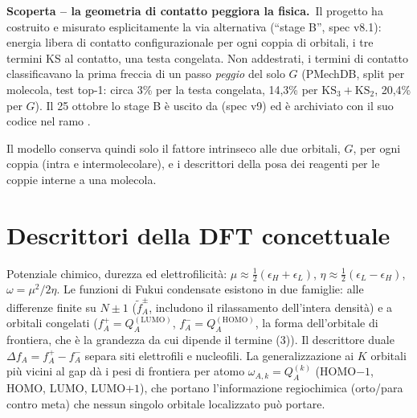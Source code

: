 \documentclass[11pt,a4paper]{report}
\newcommand{\code}[1]{\texttt{\detokenize{#1}}}
\newcommand{\scoperta}[2]{%
  \par\medskip\noindent\colorbox{ksgiallo}{\parbox{\dimexpr\linewidth-2\fboxsep\relax}{%
  \small\textbf{\color{ksrosso}Scoperta -- #1.}\ #2}}\par\medskip}
\begin{document}
\scoperta{la geometria di contatto peggiora la fisica}{Il progetto ha costruito e misurato
esplicitamente la via alternativa (\enquote{stage B}, spec v8.1): energia libera di contatto
configurazionale per ogni coppia di orbitali, i tre termini KS al contatto, una testa congelata.
Non addestrati, i termini di contatto classificavano la prima freccia di un passo \emph{peggio} del
solo $G$ (PMechDB, split per molecola, test top-1: circa 3\% per la testa congelata, 14{,}3\% per
$\mathrm{KS}_3+\mathrm{KS}_2$, 20{,}4\% per $G$). Il 25 ottobre lo stage B è uscito da \code{main}
(spec v9) ed è archiviato con il suo codice nel ramo \code{archive/stage-b}.}

Il modello conserva quindi solo il fattore intrinseco alle due orbitali, $G$, per ogni coppia (intra e
intermolecolare), e i descrittori della posa dei reagenti per le coppie interne a una molecola.

\section{Descrittori della DFT concettuale}
Potenziale chimico, durezza ed elettrofilicità: $\mu\approx\tfrac12(\epsilon_H+\epsilon_L)$,
$\eta\approx\tfrac12(\epsilon_L-\epsilon_H)$, $\omega=\mu^2/2\eta$. Le funzioni di Fukui condensate
esistono in due famiglie: alle differenze finite su $N\pm1$ ($\tilde f^\pm_A$, includono il
rilassamento dell'intera densità) e a orbitali congelati ($f^+_A=Q^{(\mathrm{LUMO})}_A$,
$f^-_A=Q^{(\mathrm{HOMO})}_A$, la forma dell'orbitale di frontiera, che è la grandezza da cui dipende il
termine (3)). Il descrittore duale $\Delta f_A=f^+_A-f^-_A$ separa siti elettrofili e nucleofili.
La generalizzazione ai $K$ orbitali più vicini al gap dà i pesi di frontiera per atomo
$\omega_{A,k}=Q^{(k)}_A$ (HOMO$-1$, HOMO, LUMO, LUMO$+1$), che portano l'informazione regiochimica
(orto/para contro meta) che nessun singolo orbitale localizzato può portare.
\end{document}
